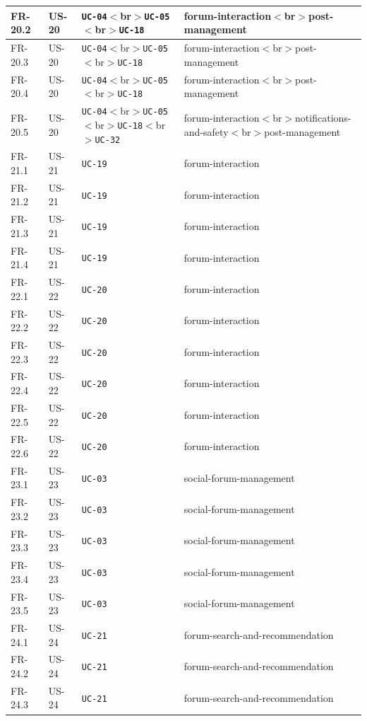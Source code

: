 \documentclass[12pt]{article}
\begin{document}
\begin{longtable}{|>{\raggedright\arraybackslash}p{}|>{\raggedright\arraybackslash}p{}|>{\raggedright\arraybackslash}p{}|>{\raggedright\arraybackslash}p{}|}
FR-20.2 & US-20 & \texttt{UC-04}$<$br$>$\texttt{UC-05}$<$br$>$\texttt{UC-18} & forum-interaction$<$br$>$post-management \\ \hline
FR-20.3 & US-20 & \texttt{UC-04}$<$br$>$\texttt{UC-05}$<$br$>$\texttt{UC-18} & forum-interaction$<$br$>$post-management \\ \hline
FR-20.4 & US-20 & \texttt{UC-04}$<$br$>$\texttt{UC-05}$<$br$>$\texttt{UC-18} & forum-interaction$<$br$>$post-management \\ \hline
FR-20.5 & US-20 & \texttt{UC-04}$<$br$>$\texttt{UC-05}$<$br$>$\texttt{UC-18}$<$br$>$\texttt{UC-32} & forum-interaction$<$br$>$notifications-and-safety$<$br$>$post-management \\ \hline
FR-21.1 & US-21 & \texttt{UC-19} & forum-interaction \\ \hline
FR-21.2 & US-21 & \texttt{UC-19} & forum-interaction \\ \hline
FR-21.3 & US-21 & \texttt{UC-19} & forum-interaction \\ \hline
FR-21.4 & US-21 & \texttt{UC-19} & forum-interaction \\ \hline
FR-22.1 & US-22 & \texttt{UC-20} & forum-interaction \\ \hline
FR-22.2 & US-22 & \texttt{UC-20} & forum-interaction \\ \hline
FR-22.3 & US-22 & \texttt{UC-20} & forum-interaction \\ \hline
FR-22.4 & US-22 & \texttt{UC-20} & forum-interaction \\ \hline
FR-22.5 & US-22 & \texttt{UC-20} & forum-interaction \\ \hline
FR-22.6 & US-22 & \texttt{UC-20} & forum-interaction \\ \hline
FR-23.1 & US-23 & \texttt{UC-03} & social-forum-management \\ \hline
FR-23.2 & US-23 & \texttt{UC-03} & social-forum-management \\ \hline
FR-23.3 & US-23 & \texttt{UC-03} & social-forum-management \\ \hline
FR-23.4 & US-23 & \texttt{UC-03} & social-forum-management \\ \hline
FR-23.5 & US-23 & \texttt{UC-03} & social-forum-management \\ \hline
FR-24.1 & US-24 & \texttt{UC-21} & forum-search-and-recommendation \\ \hline
FR-24.2 & US-24 & \texttt{UC-21} & forum-search-and-recommendation \\ \hline
FR-24.3 & US-24 & \texttt{UC-21} & forum-search-and-recommendation \\ \hline

\end{longtable}
\end{document}
